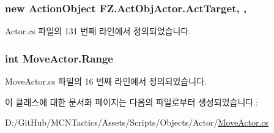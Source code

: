 \subsubsection[{\texorpdfstring{Act\+Target}{ActTarget}}]{\setlength{\rightskip}{0pt plus 5cm}new {\bf Action\+Object} F\+Z.\+Act\+Obj\+Actor.\+Act\+Target\hspace{0.3cm}{\ttfamily [get]}, {\ttfamily [protected]}, {\ttfamily [inherited]}}\hypertarget{class_f_z_1_1_act_obj_actor_abb12c3b4970b1e028a57e16f04065944}{}\label{class_f_z_1_1_act_obj_actor_abb12c3b4970b1e028a57e16f04065944}


Actor.\+cs 파일의 131 번째 라인에서 정의되었습니다.

\subsubsection[{\texorpdfstring{Range}{Range}}]{\setlength{\rightskip}{0pt plus 5cm}int Move\+Actor.\+Range\hspace{0.3cm}{\ttfamily [get]}}\hypertarget{class_move_actor_a4473f7867a074c8ca605220086c5d8fd}{}\label{class_move_actor_a4473f7867a074c8ca605220086c5d8fd}


Move\+Actor.\+cs 파일의 16 번째 라인에서 정의되었습니다.



이 클래스에 대한 문서화 페이지는 다음의 파일로부터 생성되었습니다.\+:\begin{DoxyCompactItemize}
\item 
D\+:/\+Git\+Hub/\+M\+C\+N\+Tactics/\+Assets/\+Scripts/\+Objects/\+Actor/\hyperlink{_move_actor_8cs}{Move\+Actor.\+cs}\end{DoxyCompactItemize}
